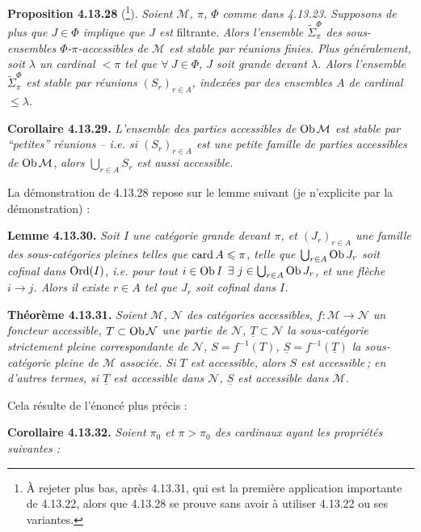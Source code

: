 \textbf{Proposition 4.13.28} (\footnote{À rejeter plus bas, après 4.13.31, qui est la première application importante de 4.13.22, alors que 4.13.28 se prouve sans avoir à utiliser 4.13.22 ou ses variantes.}). \textit{Soient $\mathcal{M}$, $\pi$, $\Phi$ comme dans 4.13.23. Supposons de plus que $J\in\Phi$ implique que $J$ est} filtrante. \textit{Alors l'ensemble $\tilde{\Sigma}^{\Phi}_{\pi}$ des sous-ensembles $\Phi$-$\pi$-accessibles de $\mathcal{M}$ est stable par réunions finies. Plus généralement, soit $\lambda$ un cardinal $<\pi$ tel que $\forall\ J\in\Phi$, $J$ soit grande devant $\lambda$. Alors l'ensemble $\tilde{\Sigma}^{\Phi}_{\pi}$ est stable par réunions $(S_r)_{r\in A}$, indexées par des ensembles $A$ de cardinal $\leqslant\lambda$.}

\textbf{Corollaire 4.13.29.} \textit{L'ensemble des parties accessibles de} $\operatorname{Ob}\mathcal{M}$ \textit{est stable par “petites” réunions -- i.e. si $(S_r)_{r\in A}$ est une petite famille de parties accessibles de} $\operatorname{Ob}\mathcal{M}$, \textit{alors $\bigcup_{r\in A}S_r$ est aussi accessible.}

La démonstration de 4.13.28 repose sur le lemme suivant (je n'explicite par la démonstration) : %

\textbf{Lemme 4.13.30.} \textit{Soit $I$ une catégorie grande devant $\pi$, et $(J_r)_{r\in A}$ une famille des sous-catégories pleines telles que $\operatorname{card} A\leqslant\pi$, telle que $\bigcup_{r\in A}\operatorname{Ob} J_r$ soit cofinal dans $\operatorname{Ord}(I)$, i.e. pour tout $i\in\operatorname{Ob} I$ $\exists\ j\in\bigcup_{r\in A}\operatorname{Ob} J_r$, et une flèche $i\longrightarrow j$. Alors il existe $r\in A$ tel que $J_r$ soit cofinal dans $I$.}

\textbf{Théorème 4.13.31.} \textit{Soient $\mathcal{M}$, $\mathcal{N}$ des catégories accessibles, $f:\mathcal{M}\longrightarrow\mathcal{N}$ un foncteur accessible, $T\subset\operatorname{Ob}\mathcal{N}$ une partie de $\mathcal{N}$, $\underline{T}\subset\mathcal{N}$ la sous-catégorie strictement pleine correspondante de $\mathcal{N}$, $S=f^{-1}(T)$, $\underline{S}=f^{-1}(\underline{T})$ la sous-catégorie pleine de $\mathcal{M}$ associée. Si $T$ est accessible, alors $S$ est accessible\,; en d'autres termes, si $\underline{T}$ est accessible dans $\mathcal{N}$, $\underline{S}$ est accessible dans $\mathcal{M}$.}

Cela résulte de l'énoncé plus précis :

\textbf{Corollaire 4.13.32.} \textit{Soient $\pi_0$ et $\pi>\pi_0$ des cardinaux ayant les propriétés suivantes :}

